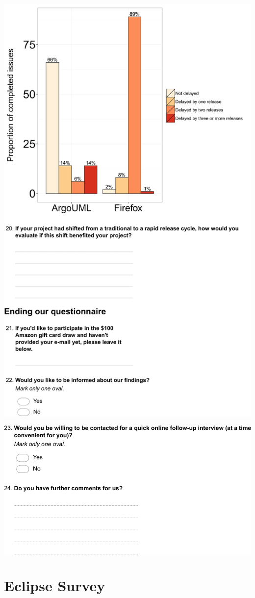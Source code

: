 \documentclass[
	12pt,				%
	openright,			%
	oneside,			%
	a4paper,			%
	french,				%
	spanish,			%
	brazil,				%
	english
	]{abntex2}
\newcounter{pt}
\newcounter{th}
\begin{document}
\begin{apendicesenv}
\includegraphics[width=.8\textwidth,keepaspectratio]{chapters/chapter5/appendix/ArgoUML7.pdf}

\includegraphics[width=.8\textwidth,keepaspectratio]{chapters/chapter5/appendix/ArgoUML8.pdf}

\chapter{Eclipse Survey}\label{appendix:c}


\end{apendicesenv}
\end{document}
